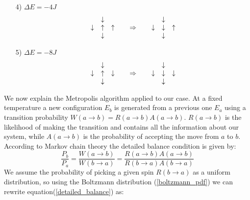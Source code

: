 \documentclass[%
preprint,
 amsmath,amssymb,
 aps,
]{revtex4-1}
\theoremstyle{plain}
\theoremstyle{definition}
\theoremstyle{plain}
\begin{document}
\begin{itemize}
\[\]
\item[4)] $\Delta E=-4J$
\[
\begin{array}{ccc}
 		& \downarrow & \\
\downarrow & \uparrow & \uparrow  \\
		   & \downarrow &  \\
\end{array}
\hspace{0.5cm}
\Rightarrow
\hspace{0.5cm}
\begin{array}{ccc}
 		& \downarrow & \\
\downarrow & \downarrow & \uparrow  \\
		   & \downarrow &  \\
\end{array}
\]
\item[5)] $\Delta E=-8J$
\[
\begin{array}{ccc}
 		& \downarrow & \\
\downarrow & \uparrow & \downarrow \\
		   & \downarrow &  \\
\end{array}
\hspace{0.5cm}
\Rightarrow
\hspace{0.5cm}
\begin{array}{ccc}
 		& \downarrow & \\
\downarrow & \downarrow & \downarrow  \\
		   & \downarrow &  \\
\end{array}
\]
\end{itemize}
We now explain the Metropolis algorithm applied to our case.
At a fixed temperature a new configuration $E_b$ is generated from a previous one $E_a$ using a transition probability $W(a\to b)=R(a\to b) A(a\to b)$. $R(a\to b)$ is the likelihood of making the transition and contains all the information about our system, while $A(a\to b)$ is the probability of accepting the move from $a$ to $b$. According to Markov chain theory the detailed balance condition is given by:
\begin{equation}
\label{detailed_balance}
\frac{P_b}{P_a} = \frac{W(a\to b)}{W(b\to a)} = \frac{R(a\to b) A(a\to b)}{R(b\to a) A(b\to a)}
\end{equation}
We assume the probability of picking a given spin $R(b\to a)$ as a uniform distribution, so using the Boltzmann distribution (\ref{boltzmann_pdf}) we can rewrite equation(\ref{detailed_balance}) as:
\end{document}
